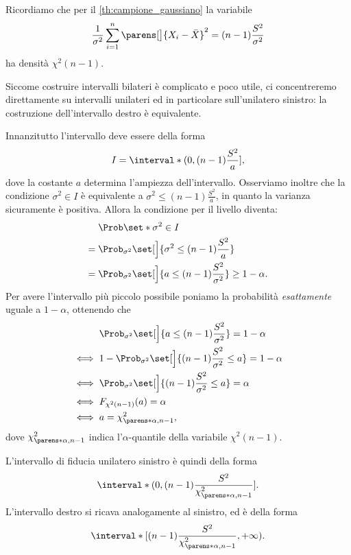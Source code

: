 Ricordiamo che per il \autoref{th:campione_gaussiano} la variabile \[
    \frac{1}{\sigma^2} \sum_{i=1}^n \parens[\big]{X_i - \bar X}^2 = (n-1)\frac{S^2}{\sigma^2} 
\] ha densità $\chi^2(n-1)$.

Siccome costruire intervalli bilateri è complicato e poco utile, ci concentreremo direttamente su intervalli unilateri ed in particolare sull'unilatero sinistro: la costruzione dell'intervallo destro è equivalente.

Innanzitutto l'intervallo deve essere della forma \[
    I = \interval*({0, (n-1)\frac{S^2}{a}}],
\] dove la costante $a$ determina l'ampiezza dell'intervallo. Osserviamo inoltre che la condizione $\sigma^2 \in I$ è equivalente a $\sigma^2 \leq (n-1)\frac{S^2}{a}$, in quanto la varianza sicuramente è positiva. Allora la condizione per il livello diventa:
\begin{align*}
    &\Prob\set*{\sigma^2 \in I} \\
    = {}&\Prob_{\sigma^2}\set[\Big]{\sigma^2 \leq (n-1)\frac{S^2}{a}} \\ 
    = {}&\Prob_{\sigma^2}\set[\Big]{a \leq (n-1)\frac{S^2}{\sigma^2}} \geq 1 - \alpha. \\
\end{align*}
Per avere l'intervallo più piccolo possibile poniamo la probabilità \emph{esattamente} uguale a $1 - \alpha$, ottenendo che \begin{align*}
    &\Prob_{\sigma^2}\set[\Big]{a \leq (n-1)\frac{S^2}{\sigma^2}} = 1 - \alpha \\
    \iff {}&1 - \Prob_{\sigma^2}\set[\Big]{(n-1)\frac{S^2}{\sigma^2} \leq a} = 1 - \alpha \\
    \iff {}&\Prob_{\sigma^2}\set[\Big]{(n-1)\frac{S^2}{\sigma^2} \leq a} = \alpha \\
    \iff {}&F_{\chi^2(n-1)}(a) = \alpha \\
    \iff {}&a = \chi^2_{\parens*{\alpha, n-1}}, \\
\end{align*} dove $\chi^2_{\parens*{\alpha, n-1}}$ indica l'$\alpha$-quantile della variabile $\chi^2(n-1)$.

L'intervallo di fiducia unilatero sinistro è quindi della forma \[
    \interval*({0, (n-1)\frac{S^2}{\chi^2_{\parens*{\alpha, n-1}}}}].
\] L'intervallo destro si ricava analogamente al sinistro, ed è della forma \[
    \interval*[{(n-1)\frac{S^2}{\chi^2_{\parens*{\alpha, n-1}}}, +\infty}).
\]
